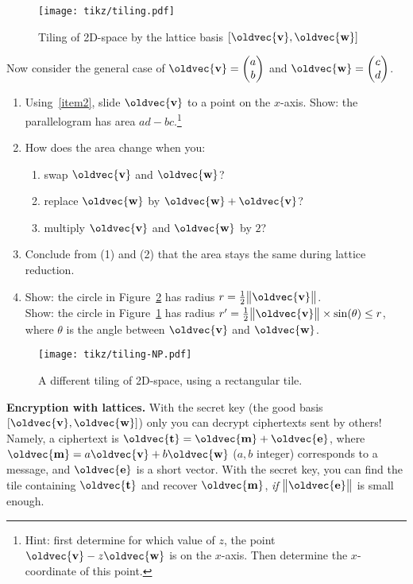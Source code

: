 \documentclass[10pt,a4paper]{article}
\newcommand{\twovec}[2]{\ensuremath{\begin{pmatrix}{#1}\\{#2}\end{pmatrix}}}
\renewcommand{\vec}[1]{\oldvec{\mathbf{#1}}}
\DeclarePairedDelimiter{\norm}{\big\lVert}{\big\rVert}
\begin{document}
\begin{figure}[h!]
	\centering\texttt{[image: tikz/tiling.pdf]}
	\caption{Tiling of 2D-space by the lattice basis \([\vec{v}, \vec{w}]\)}\label{fig:tiling}
\end{figure}

\noindent
Now consider the general case of \(\vec{v} = \twovec{a}{b}\) and \(\vec{w} = \twovec{c}{d}\).

\begin{enumerate}[resume*]
	\item Using~\ref{item2}, slide \(\vec{v}\) to a point on the \(x\)-axis.
		Show: the parallelogram has area \(ad - bc\).\footnote{Hint: first determine for which value of \(z\), the point \(\vec{v} - z \vec{w}\) is on the \(x\)-axis. Then determine the \(x\)-coordinate of this point.}

	\item How does the area change when you:
		\begin{enumerate}
		\item swap \(\vec{v}\) and \(\vec{w}\)?
		\item replace \(\vec{w}\) by \(\vec{w} + \vec{v}\)?
		\item multiply \(\vec{v}\) and \(\vec{w}\) by \(2\)?
		\end{enumerate}
	\item Conclude from (1) and (2) that the area stays the same during lattice reduction.

	\item
		Show: the circle in Figure~\ref{fig:tiling-np} has radius \(r = \frac12 \norm{\vec{v}}\). \\
		Show: the circle in Figure~\ref{fig:tiling} has radius \(r' = \frac12 \norm{\vec{v}} \times \sin(\theta) \leq r\), where \(\theta\) is the angle between \(\vec{v}\) and \(\vec{w}\). \\
\end{enumerate}
\begin{figure}[h!]
	\centering\texttt{[image: tikz/tiling-NP.pdf]}
	\caption{A different tiling of 2D-space, using a rectangular tile.}\label{fig:tiling-np}
\end{figure}
\noindent
\textbf{Encryption with lattices.}
With the secret key (the good basis \([\vec{v},\vec{w}]\)) only you can decrypt ciphertexts sent by others!
Namely, a ciphertext is \(\vec{t} = \vec{m} + \vec{e}\),
	where \(\vec{m} = a \vec{v} + b \vec{w}\) (\(a, b\) integer) corresponds to a message,
	and \(\vec{e}\) is a short vector.
With the secret key, you can find the tile containing \(\vec{t}\) and recover \(\vec{m}\), \emph{if} \(\norm{\vec{e}}\) is small enough.
\end{document}
